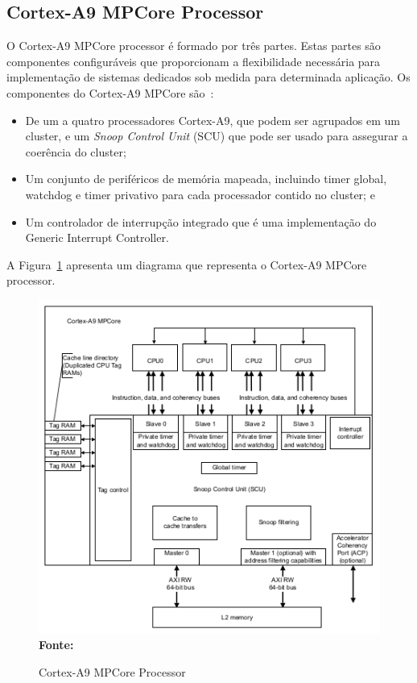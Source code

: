\subsection{Cortex-A9 MPCore Processor}
O Cortex-A9 MPCore processor é formado por três partes. Estas partes são componentes configuráveis que proporcionam a flexibilidade necessária para implementação de sistemas dedicados sob medida para determinada aplicação. Os componentes do Cortex-A9 MPCore são~\cite{mpcore}:

\begin{itemize}
    \item De um a quatro processadores Cortex-A9, que podem ser agrupados em um cluster, e um \textit{Snoop Control Unit} (SCU) que pode ser usado para assegurar a coerência do cluster;

    \item Um conjunto de periféricos de memória mapeada, incluindo timer global, watchdog e timer privativo para cada processador contido no cluster; e
    
    \item Um controlador de interrupção integrado que é uma implementação do Generic Interrupt Controller. 
\end{itemize}

A Figura~\ref{fig:mpcore} apresenta um diagrama que representa o Cortex-A9 MPCore processor.

\begin{figure}[ht]
	\caption{Cortex-A9 MPCore Processor}
	\begin{center}
		\includegraphics[scale=0.7]{imagens/mpcoreA9.png}\\
		{\small \textbf{Fonte:} }
    \end{center}\label{fig:mpcore}
\end{figure}

